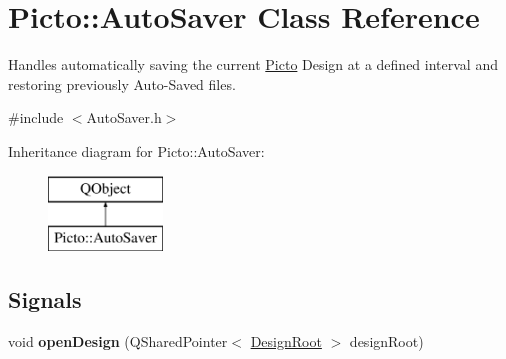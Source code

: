 \hypertarget{class_picto_1_1_auto_saver}{\section{Picto\-:\-:Auto\-Saver Class Reference}
\label{class_picto_1_1_auto_saver}
}


Handles automatically saving the current \hyperlink{namespace_picto}{Picto} Design at a defined interval and restoring previously Auto-\/\-Saved files.  




{\ttfamily \#include $<$Auto\-Saver.\-h$>$}

Inheritance diagram for Picto\-:\-:Auto\-Saver\-:\begin{figure}[H]
\begin{center}
\leavevmode
\includegraphics[height=2.000000cm]{class_picto_1_1_auto_saver}
\end{center}
\end{figure}
\subsection*{Signals}
\begin{DoxyCompactItemize}
\item 
\hypertarget{class_picto_1_1_auto_saver_a14564b40de4eb7e14aea620e2b5b708b}{void {\bfseries open\-Design} (Q\-Shared\-Pointer$<$ \hyperlink{class_picto_1_1_design_root}{Design\-Root} $>$ design\-Root)}\label{class_picto_1_1_auto_saver_a14564b40de4eb7e14aea620e2b5b708b}

\end{DoxyCompactItemize}
